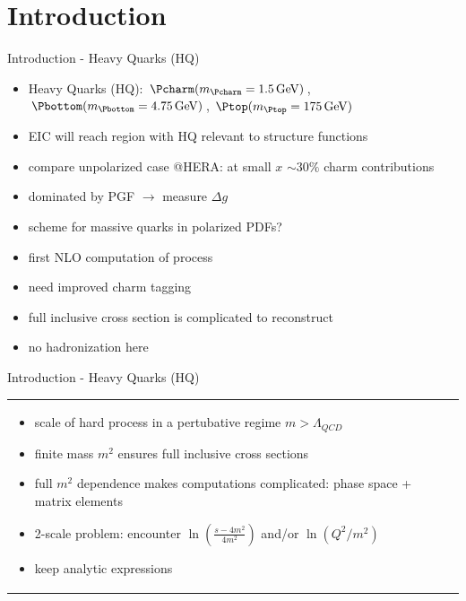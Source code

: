 \section{Introduction}

\begin{frame}{Introduction - Heavy Quarks (HQ)}
\begin{itemize}
\item Heavy Quarks (HQ): $\Pcharm (m_{\Pcharm}=\SI{1.5}{\GeV})$, $\Pbottom (m_{\Pbottom}=\SI{4.75}{\GeV})$, $\Ptop (m_{\Ptop}=\SI{175}{\GeV})$
\item EIC will reach region with HQ relevant to structure functions
\item compare unpolarized case @HERA: at small $x$ $\sim 30\%$ charm contributions
\item dominated by PGF $\to$ measure $\Delta g$
\item scheme for massive quarks in polarized PDFs?
\item first NLO computation of process
\end{itemize}
\begin{itemize}
\item need improved charm tagging
\item full inclusive cross section is complicated to reconstruct
\item no hadronization here
\end{itemize}
\end{frame}

\begin{frame}{Introduction - Heavy Quarks (HQ)}
\begin{tabular}{wi}
\begin{itemize}
\item scale of hard process in a pertubative regime $m>\Lambda_{QCD}$
\item finite mass $m^2$ ensures full inclusive cross sections
\item full $m^2$ dependence makes computations complicated: phase space + matrix elements
\item 2-scale problem: encounter $\ln\left(\frac{s-4m^2}{4m^2}\right)$ and/or $\ln(Q^2/m^2)$
\item keep analytic expressions
\end{itemize}
&
\end{tabular}
\end{frame}

